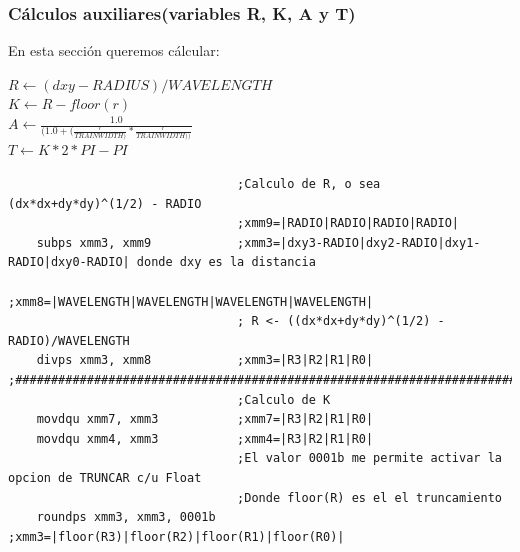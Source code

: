 \subsubsection*{Cálculos auxiliares(variables R, K, A y T)}

En esta sección queremos cálcular:

\begin{center}
	$R \gets (dxy-RADIUS)/WAVELENGTH$\\
	$K \gets R-floor(r)$ \\
	$A \gets \frac{1.0}{(1.0+(\frac{r}{TRAINWIDTH)}*\frac{r}{TRAINWIDTH))}}$ \\
	$T \gets K*2*PI-PI$
\end{center}

\begin{codesnippet}
\begin{verbatim}
                                ;Calculo de R, o sea (dx*dx+dy*dy)^(1/2) - RADIO 
                                ;xmm9=|RADIO|RADIO|RADIO|RADIO|
    subps xmm3, xmm9            ;xmm3=|dxy3-RADIO|dxy2-RADIO|dxy1-RADIO|dxy0-RADIO| donde dxy es la distancia
                                ;xmm8=|WAVELENGTH|WAVELENGTH|WAVELENGTH|WAVELENGTH|
                                ; R <- ((dx*dx+dy*dy)^(1/2) - RADIO)/WAVELENGTH
    divps xmm3, xmm8            ;xmm3=|R3|R2|R1|R0|	
;###################################################################################
                                ;Calculo de K
    movdqu xmm7, xmm3           ;xmm7=|R3|R2|R1|R0|
    movdqu xmm4, xmm3           ;xmm4=|R3|R2|R1|R0|
                                ;El valor 0001b me permite activar la opcion de TRUNCAR c/u Float
                                ;Donde floor(R) es el el truncamiento
    roundps xmm3, xmm3, 0001b   ;xmm3=|floor(R3)|floor(R2)|floor(R1)|floor(R0)|


\end{verbatim}
\end{codesnippet}
